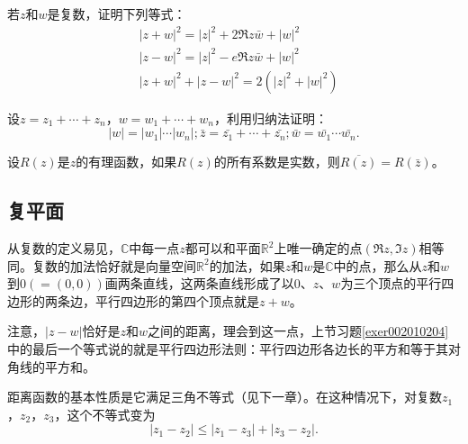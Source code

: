 \begin{exercise}\label{exer002010204}
若$z$和$w$是复数，证明下列等式：
\[
\begin{aligned}
&|z+w|^2 = |z|^2 + 2\Re{z\bar{w}} + |w|^2 \\
&|z-w|^2 = |z|^2 - e\Re{z\bar{w}} + |w|^2 \\
&|z+w|^2 + |z-w|^2 = 2(|z|^2+|w|^2)
\end{aligned}
\]
\end{exercise}

\begin{exercise}
设$z=z_1+\cdots+z_n$，$w= w_1+\cdots+w_n$，利用归纳法证明：
\[
|w| = |w_1|\cdots|w_n|; \bar{z}=\bar{z_1}+\cdots+\bar{z_n}; \bar{w}=\bar{w_1}\cdots\bar{w_n}.
\]
\end{exercise}

\begin{exercise}
设$R(z)$是$z$的有理函数，如果$R(z)$的所有系数是实数，则$\overline{R(z)} = R(\bar{z})$。
\end{exercise}

\subsection{复平面}\label{subsection0020103}
从复数的定义易见，$\mathbb{C}$中每一点$z$都可以和平面$\mathbb{R}^2$上唯一确定的点$(\Re{z}, \Im{z})$相等同。复数的加法恰好就是向量空间$\mathbb{R}^2$的加法，如果$z$和$w$是$\mathbb{C}$中的点，那么从$z$和$w$到$0(=(0,0))$画两条直线，这两条直线形成了以$0$、$z$、$w$为三个顶点的平行四边形的两条边，平行四边形的第四个顶点就是$z+w$。

注意，$|z-w|$恰好是$z$和$w$之间的距离，理会到这一点，上节习题\ref{exer002010204}中的最后一个等式说的就是平行四边形法则：平行四边形各边长的平方和等于其对角线的平方和。

距离函数的基本性质是它满足三角不等式（见下一章）。在这种情况下，对复数$z_1$，$z_2$，$z_3$，这个不等式变为
\[
|z_1-z_2| \le |z_1-z_3| + |z_3-z_2|.
\]

